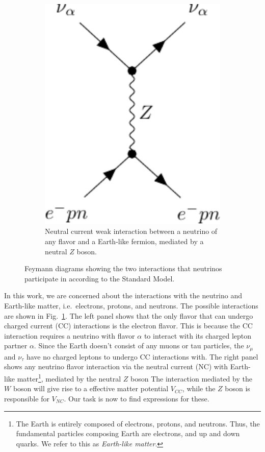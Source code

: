 \begin{figure}
    \quad
    \begin{subfigure}{0.3\textwidth}
        \includegraphics[width=1\textwidth]{figures/z-boson.pdf} 
        \caption{Neutral current weak interaction between a neutrino of any flavor and a Earth-like fermion,
        mediated by a neutral $Z$ boson.}
    \end{subfigure}%
    \caption{Feymann diagrams showing the two interactions that neutrinos participate in according to the Standard Model.}\label{fig:w_and_z}
\end{figure}
In this work, we are concerned about the interactions with the neutrino and Earth-like matter, i.e.~electrons, protons, and neutrons. 
The possible interactions are shown in Fig.~\ref{fig:w_and_z}. The left panel shows that the only flavor that can undergo charged current (CC) 
interactions is the electron flavor. This is because the CC interaction requires a neutrino with flavor $\alpha$ to interact with its charged lepton 
partner $\alpha$. Since the Earth doesn't consist of any muons or tau particles, the $\nu_\mu$ and $\nu_\tau$ have no charged leptons to undergo CC interactions with. 
The right panel shows any neutrino flavor interaction via the neutral current (NC) with Earth-like matter\footnote{The Earth is entirely composed
of electrons, protons, and neutrons. Thus, the fundamental particles composing Earth are electrons, and up and down quarks. We refer to this as \emph{Earth-like matter}.}, mediated by the neutral $Z$ boson
The interaction mediated by the $W$ boson will give rise to a effective matter potential $V_{CC}$, while
the $Z$ boson is responsible for $V_{NC}$. Our task is now to find expressions for these.

